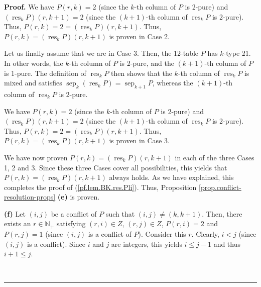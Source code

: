 \documentclass[numbers=enddot,12pt,final,onecolumn,notitlepage]{scrartcl}%
\theoremstyle{definition}
\newenvironment{proof}[1][Proof]{\noindent\textbf{#1.} }{\ \rule{0.5em}{0.5em}}
\begin{document}
\begin{proof}
We have $P\left(  r,k\right)  =2$ (since the $k$-th column of $P$ is 2-pure)
and $\left(  \operatorname*{res}\nolimits_{k}P\right)  \left(  r,k+1\right)
=2$ (since the $\left(  k+1\right)  $-th column of $\operatorname*{res}%
\nolimits_{k}P$ is 2-pure). Thus, $P\left(  r,k\right)  =2=\left(
\operatorname*{res}\nolimits_{k}P\right)  \left(  r,k+1\right)  $. Thus,
$P\left(  r,k\right)  =\left(  \operatorname*{res}\nolimits_{k}P\right)
\left(  r,k+1\right)  $ is proven in Case 2.

Let us finally assume that we are in Case 3. Then, the 12-table $P$ has
$k$-type 21. In other words, the $k$-th column of $P$ is 2-pure, and the
$\left(  k+1\right)  $-th column of $P$ is 1-pure. The definition of
$\operatorname*{res}\nolimits_{k}P$ then shows that the $k$-th column of
$\operatorname*{res}_{k}P$ is mixed and satisfies $\operatorname*{sep}%
\nolimits_{k}\left(  \operatorname*{res}\nolimits_{k}P\right)
=\operatorname*{sep}\nolimits_{k+1}P$, whereas the $\left(  k+1\right)  $-th
column of $\operatorname*{res}\nolimits_{k}P$ is 2-pure.

We have $P\left(  r,k\right)  =2$ (since the $k$-th column of $P$ is 2-pure)
and $\left(  \operatorname*{res}\nolimits_{k}P\right)  \left(  r,k+1\right)
=2$ (since the $\left(  k+1\right)  $-th column of $\operatorname*{res}%
\nolimits_{k}P$ is 2-pure). Thus, $P\left(  r,k\right)  =2=\left(
\operatorname*{res}\nolimits_{k}P\right)  \left(  r,k+1\right)  $. Thus,
$P\left(  r,k\right)  =\left(  \operatorname*{res}\nolimits_{k}P\right)
\left(  r,k+1\right)  $ is proven in Case 3.

We have now proven $P\left(  r,k\right)  =\left(  \operatorname*{res}%
\nolimits_{k}P\right)  \left(  r,k+1\right)  $ in each of the three Cases 1, 2
and 3. Since these three Cases cover all possibilities, this yields that
$P\left(  r,k\right)  =\left(  \operatorname*{res}\nolimits_{k}P\right)
\left(  r,k+1\right)  $ always holds. As we have explained, this completes the
proof of (\ref{pf.lem.BK.res.Pli}). Thus, Proposition
\ref{prop.conflict-resolution-props} \textbf{(e)} is proven.

\textbf{(f)} Let $\left(  i,j\right)  $ be a conflict of $P$ such that
$\left(  i,j\right)  \neq\left(  k,k+1\right)  $. Then, there exists an
$r\in\mathbb{N}_{+}$ satisfying $\left(  r,i\right)  \in Z$, $\left(
r,j\right)  \in Z$, $P\left(  r,i\right)  =2$ and $P\left(  r,j\right)  =1$
(since $\left(  i,j\right)  $ is a conflict of $P$). Consider this $r$.
Clearly, $i<j$ (since $\left(  i,j\right)  $ is a conflict). Since $i$ and $j$
are integers, this yields $i\leq j-1$ and thus $i+1\leq j$.


\end{proof}
\end{document}
